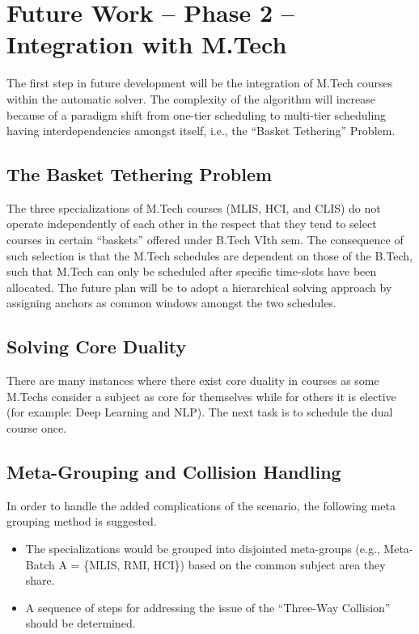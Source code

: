 \section{Future Work – Phase 2 – Integration with M.Tech}

The first step in future development will be the integration of M.Tech courses within the automatic solver. The complexity of the algorithm will increase because of a paradigm shift from one-tier scheduling to multi-tier scheduling having interdependencies amongst itself, i.e., the ``Basket Tethering'' Problem.

\subsection{The Basket Tethering Problem}

The three specializations of M.Tech courses (MLIS, HCI, and CLIS) do not operate independently of each other in the respect that they tend to select courses in certain “baskets” offered under B.Tech VIth sem. The consequence of such selection is that the M.Tech schedules are dependent on those of the B.Tech, such that M.Tech can only be scheduled after specific time-slots have been allocated. The future plan will be to adopt a hierarchical solving approach by assigning anchors as common windows amongst the two schedules.

\subsection{Solving Core Duality}

There are many instances where there exist core duality in courses as some M.Techs consider a subject as core for themselves while for others it is elective (for example: Deep Learning and NLP). The next task is to schedule the dual course once.

\subsection{Meta-Grouping and Collision Handling}

In order to handle the added complications of the scenario, the following meta grouping method is suggested.


\begin{itemize}

    \item The specializations would be grouped into disjointed meta-groups (e.g., Meta-Batch A = \{MLIS, RMI, HCI\}) based on the common subject area they share.

    \item A sequence of steps for addressing the issue of the ``Three-Way Collision'' should be determined.

\end{itemize}

